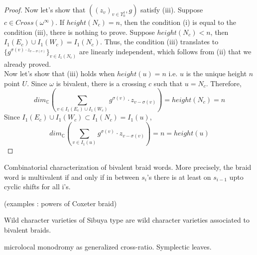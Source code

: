 \begin{proof}
Now let's show that $((z_v)_{v\in\Upsilon_0^1},g)$ satisfy (\Rn{3}). Suppose $c\in Cross(\omega^\infty)$. If $height(N_c)=n$, then the condition (\Rn{1}) is equal to the condition (\Rn{3}), there is nothing to prove. Suppose $height(N_c)<n$, then $I_1(E_c)\cup I_1(W_c)=I_1(N_c)$. Thus, the condition (\Rn{3}) translates to $\{g^{\sigma(v)\cdot z_{v-\sigma(v)}}\}_{v\in I_1(N_c)}$ are linearly independent, which follows from (\Rn{2}) that we already proved.\\
Now let's show that (\Rn{3}) holds when $height(u)=n$ i.e. $u$ is the unique height $n$ point $U$. Since $\omega$ is bivalent, there is a crossing $c$ such that $u=N_c$. Therefore,
\[
dim_\mathbb{C}(\sum_{v\in I_1(E_c)\cup I_1(W_c)} g^{\sigma(v)}\cdot z_{v-\sigma(v)}) = height(N_c) = n
\]
Since $I_1(E_c)\cup I_1(W_c)\subset I_1(N_c)=I_1(u)$, 
\[
dim_\mathbb{C}(\sum_{v\in I_1(u)} g^{\sigma(v)}\cdot z_{v-\sigma(v)}) = n=height(u)
\]
\end{proof}

\begin{theorem}
	Combinatorial characterization of bivalent braid words. More precisely, the braid word is multivalent if and only if in between $s_i$'s there is at least on $s_{i-1}$ upto cyclic shifts for all i's.
\end{theorem}

(examples : powers of Coxeter braid)

\begin{definition}
	Wild character varieties of Sibuya type are wild character varieties associated to bivalent braids.
\end{definition}

\begin{remark}
	microlocal monodromy as generalized cross-ratio. Symplectic leaves.
\end{remark}                       

   
